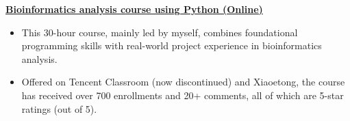
\textbf{\href{https://www.bioinfo.info/p/t_pc/goods_pc_detail/goods_detail/course_2SvfNlIVzrKfOcexHk9Nute5Bhd}{Bioinformatics analysis course using Python (Online)}}
\begin{itemize}
    \item This 30-hour course, mainly led by myself, combines foundational programming skills with real-world project experience in bioinformatics analysis.
    \item Offered on Tencent Classroom (now discontinued) and Xiaoetong, the course has received over 700 enrollments and 20+ comments, all of which are 5-star ratings (out of 5).
\end{itemize}